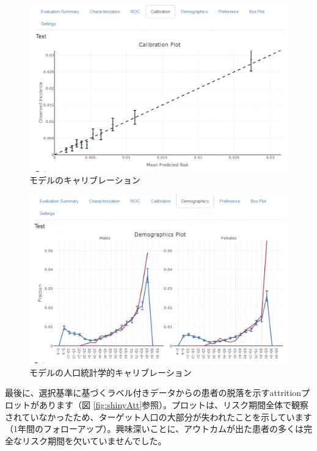 \documentclass[
  11pt]{book}
\theoremstyle{definition}
\theoremstyle{definition}
\theoremstyle{definition}
\theoremstyle{definition}
\theoremstyle{remark}
\begin{document}
\begin{figure}

{\centering \includegraphics[width=1\linewidth]{images/PatientLevelPrediction/shiny/singleShiny/singleShinyCal} 

}

\caption{モデルのキャリブレーション}\label{fig:shinyCal}
\end{figure}

\begin{figure}

{\centering \includegraphics[width=1\linewidth]{images/PatientLevelPrediction/shiny/singleShiny/singleShinyDemo} 

}

\caption{モデルの人口統計学的キャリブレーション}\label{fig:shinyDemo}
\end{figure}

最後に、選択基準に基づくラベル付きデータからの患者の脱落を示すattritionプロットがあります（図 \ref{fig:shinyAtt}参照）。プロットは、リスク期間全体で観察されていなかったため、ターゲット人口の大部分が失われたことを示しています（1年間のフォローアップ）。興味深いことに、アウトカムが出た患者の多くは完全なリスク期間を欠いていませんでした。
\end{document}
